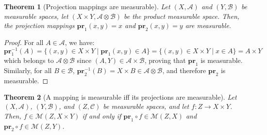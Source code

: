 \documentclass{article}
\newtheorem{theorem}{Theorem}[section]
\theoremstyle{definition}
\theoremstyle{remark}
\theoremstyle{example}
\theoremstyle{notation}
\theoremstyle{axiom}
\newcommand{\pr}{\mathbf{pr}}
\begin{document}
\begin{theorem}[Projection mappings are measurable]
		Let $(X, \mathcal{A})$ and $(Y, \mathcal{B})$ be measurable spaces, let $(X \times Y, \mathcal{A} \otimes \mathcal{B})$ be the product measurable space. Then, the projection mappings $\pr_1(x, y) = x$ and $\pr_2(x, y) = y$ are measurable.
\end{theorem}

\begin{proof}
		For all $A \in \mathcal{A}$, we have:
				$$\pr_1^{-1}(A) = \{(x, y) \in X \times Y \mid \pr_1(x, y) \in A\} = \{(x, y) \in X \times Y \mid x \in A\} = A \times Y$$
		which belongs to $\mathcal{A} \otimes \mathcal{B}$ since $(A, Y) \in \mathcal{A} \times \mathcal{B}$, proving that $\pr_1$ is measurable. Similarly, for all $B \in \mathcal{B}$, $\pr_2^{-1}(B) = X \times B \in \mathcal{A} \otimes \mathcal{B}$, and therefore $\pr_2$ is measurable.
\end{proof}

\begin{theorem}[A mapping is measurable iff its projections are measurable] %
		Let $(X, \mathcal{A})$, $(Y, \mathcal{B})$, and $(Z, \mathcal{C})$ be measurable spaces, and let $f : Z \rightarrow X \times Y$. Then, $f \in \mathcal{M}(Z, X \times Y)$ if and only if $\pr_1 \circ f \in \mathcal{M}(Z, X)$ and $\pr_2 \circ f \in \mathcal{M}(Z, Y)$.
\end{theorem}
\end{document}
